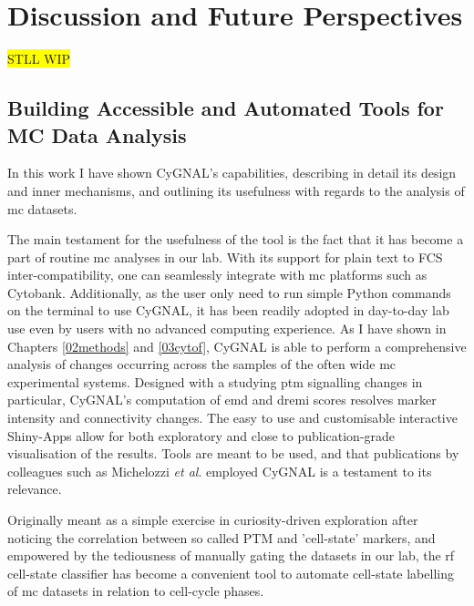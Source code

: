 \chapter{Discussion and Future Perspectives}
\label{07disc}
\colorbox{yellow}{STLL WIP}

\section{Building Accessible and Automated Tools for MC Data Analysis}

In this work I have shown CyGNAL's capabilities, describing in detail its design and inner mechanisms, and outlining its usefulness with regards to the analysis of \acrshort{mc} datasets.

The main testament for the usefulness of the tool is the fact that it has become a part of routine \acrshort{mc} analyses in our lab. With its support for plain text to FCS inter-compatibility, one can seamlessly integrate with \acrshort{mc} platforms such as Cytobank. Additionally, as the user only need to run simple Python commands on the terminal to use CyGNAL, it has been readily adopted in day-to-day lab use even by users with no advanced computing experience. 
As I have shown in Chapters \ref{02methods} and \ref{03cytof}, CyGNAL is able to perform a comprehensive analysis of changes occurring across the samples of the often wide \acrshort{mc} experimental systems. Designed with a studying \acrshort{ptm} signalling changes in particular, CyGNAL's computation of \acrshort{emd} and \acrshort{dremi} scores resolves marker intensity and connectivity changes. The easy to use and customisable interactive Shiny-Apps allow for both exploratory and close to publication-grade visualisation of the results. Tools are meant to be used, and that publications by colleagues such as Michelozzi \textit{et al}.\cite{michelozzi_activation_2023} employed CyGNAL is a testament to its relevance.

Originally meant as a simple exercise in curiosity-driven exploration after noticing the correlation between so called PTM and 'cell-state' markers, and empowered by the tediousness of manually gating the datasets in our lab, the \acrshort{rf} cell-state classifier has become a convenient tool to automate cell-state labelling of \acrshort{mc} datasets in relation to cell-cycle phases.

